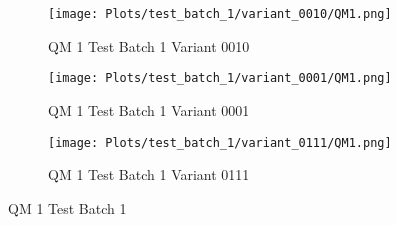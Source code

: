 \documentclass{DissertateFigs}
\begin{document}
\begin{figure}[t!]
\medskip

    \begin{subfigure}{0.47\textwidth}
    \texttt{[image: Plots/test\_batch\_1/variant\_0010/QM1.png]}
    \caption{QM 1 Test Batch 1 Variant 0010}
    \end{subfigure}
    \begin{subfigure}{0.47\textwidth}
    \texttt{[image: Plots/test\_batch\_1/variant\_0001/QM1.png]}
    \caption{QM 1 Test Batch 1 Variant 0001}
    \end{subfigure}

\medskip

    \begin{subfigure}{0.47\textwidth}
    \texttt{[image: Plots/test\_batch\_1/variant\_0111/QM1.png]}
    \caption{QM 1 Test Batch 1 Variant 0111}
    \end{subfigure}
\caption{QM 1 Test Batch 1}
    \end{figure}
\clearpage
\end{document}
